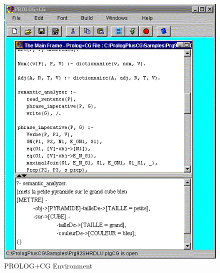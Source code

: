 \documentclass{book}
\begin{document}
\begin{latexonly}

\begin{figure}
\begin{center}
\includegraphics[scale=0.4]{snapshot1.png}
\end{center}
\caption{\label{PrologPlusCGEnvironment}PROLOG+CG Environment}
\end{figure}

\end{latexonly}
\end{document}
